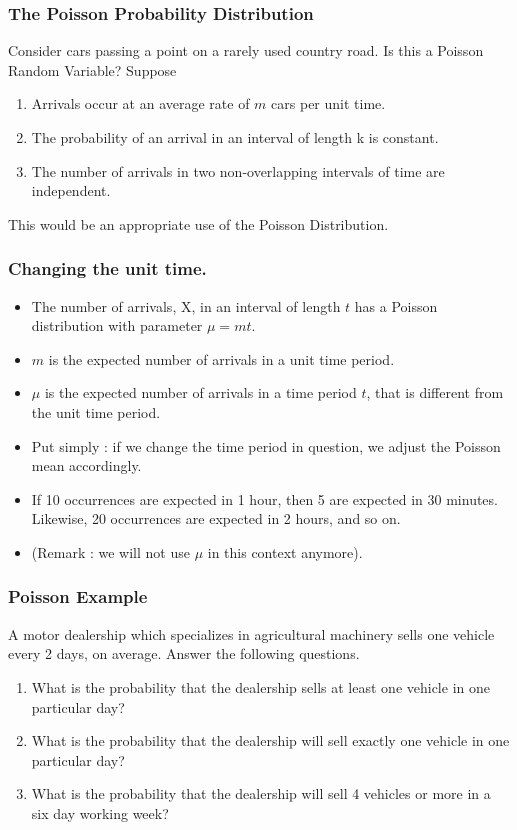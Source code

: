 


\begin{frame}
\frametitle{The Poisson Probability Distribution}
Consider cars passing a point on a rarely used country road. Is this a Poisson Random Variable?
Suppose
\begin{enumerate}
\item Arrivals occur at an average rate of $m$ cars per unit time.
\item The probability of an arrival in an interval of length k
is constant.
\item The number of arrivals in two non-overlapping
intervals of time are independent.
\end{enumerate}
This would be an appropriate use of the Poisson Distribution.
\end{frame}

\begin{frame}
\frametitle{Changing the unit time.}

\begin{itemize}
\item The number of arrivals, X, in an interval of length $t$ has a
Poisson distribution with parameter $\mu = mt$.
\item $m$ is the expected number of arrivals in a unit time period.
\item $\mu$ is the expected number of arrivals in a time period $t$, that is different from the unit time period.
\item Put simply : if we change the time period in question, we adjust the Poisson mean accordingly.
\item If 10 occurrences are expected in 1 hour, then 5 are expected in 30 minutes. Likewise, 20 occurrences are expected in 2 hours, and so on.
\item (Remark : we will not use $\mu$ in this context anymore).
\end{itemize}
\end{frame}


\begin{frame}
\frametitle{Poisson Example}
A motor dealership which specializes in agricultural machinery sells one vehicle every 2 days, on average. Answer the following questions.
    \begin{enumerate}
    \item  What is the probability that the dealership sells at least one vehicle in one particular day?
    \item  What is the probability that the dealership will sell exactly one vehicle in one particular day?
    \item  What is the probability that the dealership will sell 4 vehicles or more in a six day working week?
    \end{enumerate}
\end{frame}

